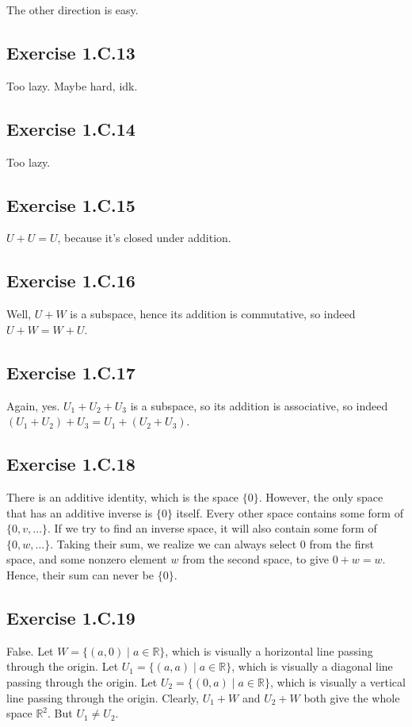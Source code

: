 \documentclass{book}
\begin{document}
The other direction is easy.

\subsection*{Exercise 1.C.13}
Too lazy. Maybe hard, idk.

\subsection*{Exercise 1.C.14}
Too lazy.

\subsection*{Exercise 1.C.15}
$U + U = U$, because it's closed under addition.

\subsection*{Exercise 1.C.16}
Well, $U + W$ is a subspace, hence its addition is commutative, so indeed $U + W = W + U$.

\subsection*{Exercise 1.C.17}
Again, yes. $U_1 + U_2 + U_3$ is a subspace, so its addition is associative, so indeed $(U_1 + U_2) + U_3 = U_1 + (U_2 + U_3)$.

\subsection*{Exercise 1.C.18}
There is an additive identity, which is the space $\{ 0 \}$. However, the only space that has an additive inverse is $\{ 0 \}$ itself. Every other space contains some form of $\{ 0, v, \ldots \}$. If we try to find an inverse space, it will also contain some form of $\{ 0, w, \ldots \}$. Taking their sum, we realize we can always select $0$ from the first space, and some nonzero element $w$ from the second space, to give $0 + w = w$. Hence, their sum can never be $\{ 0 \}$.

\subsection*{Exercise 1.C.19}
False. Let $W = \{ (a, 0) \mid a \in \mathbb{R} \}$, which is visually a horizontal line passing through the origin. Let $U_1 = \{ (a, a) \mid a \in \mathbb{R} \}$, which is visually a diagonal line passing through the origin. Let $U_2 = \{ (0, a) \mid a \in \mathbb{R} \}$, which is visually a vertical line passing through the origin. Clearly, $U_1 + W$ and $U_2 + W$ both give the whole space $\mathbb{R}^2$. But $U_1 \neq U_2$.
\end{document}
